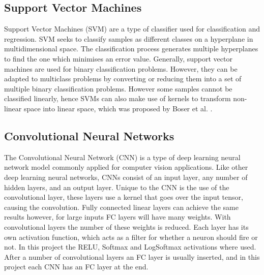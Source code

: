 \subsection{Support Vector Machines}
    Support Vector Machines (SVM) are a type of classifier used for classification and regression. SVM seeks to classify samples as different classes
    on a hyperplane in multidimensional space. The classification process generates multiple hyperplanes to find the one which minimises an error value.
    Generally, support vector machines are used for binary classification problems. However, they can be adapted to multiclass problems by converting
    or reducing them into a set of multiple binary classification problems. However some samples cannot be classified linearly, hence SVMs can also make
    use of kernels to transform non-linear space into linear space, which was proposed by Boser et al. \cite{Boser1992}.


\subsection{Convolutional Neural Networks}
The Convolutional Neural Network (CNN) is a type of deep learning neural network model commonly applied for computer vision applications.
Like other deep learning neural networks, CNNs consist of an input layer, any number of hidden layers, and an output layer.
Unique to the CNN is the use of the convolutional layer, these layers use a kernel that goes over the input tensor, causing the convolution.
Fully connected linear layers can achieve the same results however, for large inputs FC layers will have many weights.
With convolutional layers the number of these weights is reduced.
Each layer has its own activation function, which acts as a filter for whether a neuron should fire or not.
In this project the RELU, Softmax and LogSoftmax activations where used.
After a number of convolutional layers an FC layer is usually inserted, and in this project each CNN has an FC layer at the end.
